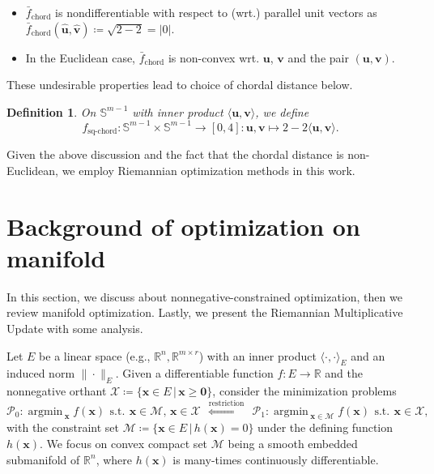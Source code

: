 \documentclass[sn-mathphys-num]{sn-jnl}
\DeclareMathOperator*{\argmin}{\textrm{argmin}\,} %
\def\st              {\,\textrm{s.t.}\,} %
\def\zeros           {\bm{0}}            %
\def\IR  {\mathbb{R}} 	    %
\def\IRn {\IR^{n}} 			%
\def\IRmr{\IR^{m \times r}} %
\def\IS {\mathbb{S}} 		%
\def\u {\bm{u}}
\def\v {\bm{v}}
\def\x {\bm{x}}
\def\cM { \mathcal{M}}
\def\cP { \mathcal{P}}
\def\cX { \mathcal{X}}
\newtheorem{definition}{Definition}
\begin{document}
\begin{itemize}
\begin{itemize}
\item $\bar{f}_{\text{chord}}$ is nondifferentiable with respect to (wrt.) parallel unit vectors as
$\bar{f}_{\text{chord}}(\hat{\u},\hat{\v}) 
\coloneqq \sqrt{2 - 2}
= |0|
$. 

\item In the Euclidean case, $\bar{f}_{\text{chord}}$ is non-convex wrt. $\u$, $\v$ and the pair $(\u,\v)$.
\end{itemize}
These undesirable properties lead to choice of chordal distance below.
\begin{definition}\label{def:chord_dist}
On $\IS^{m-1}$ with inner product $\langle \u, \v \rangle$,
we define
\[
f_{\text{sq-chord}} : \IS^{m-1} \times \IS^{m-1} \rightarrow [0, 4] 
:
\u,\v \mapsto 2 - 2 \langle \u , \v \rangle.
\]
\end{definition}
\end{itemize}

Given the above discussion and the fact that the chordal distance is non-Euclidean, we employ Riemannian optimization methods in this work.












\section{Background of optimization on manifold}\label{sec:tool}
In this section, we discuss about nonnegative-constrained optimization, then we review manifold optimization. 
Lastly, we present the Riemannian Multiplicative Update with some analysis.

Let $E$ be a linear space (e.g., $\IRn,\IRmr$) with an inner product $\langle\cdot,\cdot\rangle_E$ and an induced norm $\|\cdot\|_E$.
Given a differentiable function $f : E \to \IR$ and the nonnegative orthant $\cX \coloneqq \{ \x \in E \,|\, \x \geq \zeros\}$, consider the minimization problems
\[
\cP_0 : \argmin_{\x} f(\x) ~\st~ \x \in \cM, \, \x \in \cX
~~\overset{\text{restriction}}{\iff}~~
\cP_1 : \argmin_{\x \in \cM} f(\x) ~\st~ \x \in \cX,
\]
with the constraint set $\cM \coloneqq \{ \x \in E \,|\, h(\x) = 0 \}$ under the defining function $h(\x)$.
We focus on convex compact set $\cM$ being a smooth embedded submanifold of $\IRn$, where $h(\x)$ is many-times continuously differentiable.
\end{document}
